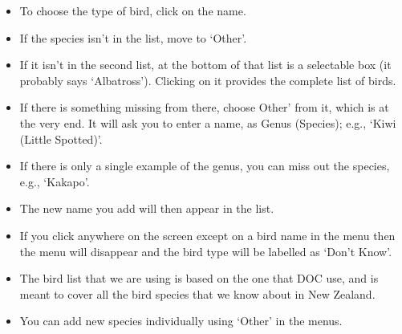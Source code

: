 \documentclass{scrartcl}
\begin{document}
\begin{itemize}
	\begin{itemize}
		\item To choose the type of bird, click on the name. 
		\item If the species isn't in the list, move to `Other'. 
		\item If it isn't in the second list, at the bottom of that list is a selectable box (it probably says `Albatross'). Clicking on it provides the complete list of birds. 
		\item If there is something missing from there, choose Other' from it, which is at the very end. It will ask you to enter a name, as Genus (Species); e.g., `Kiwi (Little Spotted)'. 
		\item If there is only a single example of the genus, you can miss out the species, e.g., `Kakapo'. 
		\item The new name you add will then appear in the list. 
		\item If you click anywhere on the screen except on a bird name in the menu then the menu will disappear and the bird type will be labelled as `Don't Know'. 
		\item The bird list that we are using is based on the one that DOC use, and is meant to cover all the bird species that we know about in New Zealand. 
		\item You can add new species individually using `Other' in the menus.
	\end{itemize}


\end{itemize}
\end{document}
